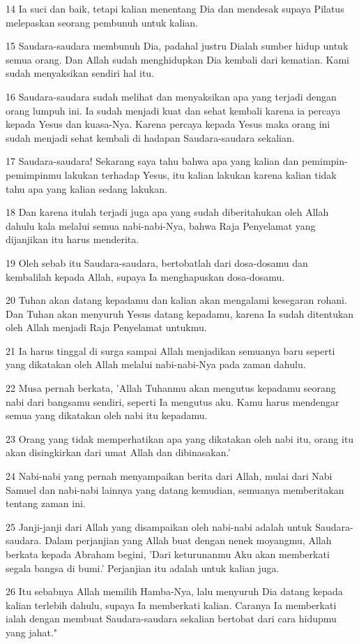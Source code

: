 \par 14 Ia suci dan baik, tetapi kalian menentang Dia dan mendesak supaya Pilatus melepaskan seorang pembunuh untuk kalian.
\par 15 Saudara-saudara membunuh Dia, padahal justru Dialah sumber hidup untuk semua orang. Dan Allah sudah menghidupkan Dia kembali dari kematian. Kami sudah menyaksikan sendiri hal itu.
\par 16 Saudara-saudara sudah melihat dan menyaksikan apa yang terjadi dengan orang lumpuh ini. Ia sudah menjadi kuat dan sehat kembali karena ia percaya kepada Yesus dan kuasa-Nya. Karena percaya kepada Yesus maka orang ini sudah menjadi sehat kembali di hadapan Saudara-saudara sekalian.
\par 17 Saudara-saudara! Sekarang saya tahu bahwa apa yang kalian dan pemimpin-pemimpinmu lakukan terhadap Yesus, itu kalian lakukan karena kalian tidak tahu apa yang kalian sedang lakukan.
\par 18 Dan karena itulah terjadi juga apa yang sudah diberitahukan oleh Allah dahulu kala melalui semua nabi-nabi-Nya, bahwa Raja Penyelamat yang dijanjikan itu harus menderita.
\par 19 Oleh sebab itu Saudara-saudara, bertobatlah dari dosa-dosamu dan kembalilah kepada Allah, supaya Ia menghapuskan dosa-dosamu.
\par 20 Tuhan akan datang kepadamu dan kalian akan mengalami kesegaran rohani. Dan Tuhan akan menyuruh Yesus datang kepadamu, karena Ia sudah ditentukan oleh Allah menjadi Raja Penyelamat untukmu.
\par 21 Ia harus tinggal di surga sampai Allah menjadikan semuanya baru seperti yang dikatakan oleh Allah melalui nabi-nabi-Nya pada zaman dahulu.
\par 22 Musa pernah berkata, 'Allah Tuhanmu akan mengutus kepadamu seorang nabi dari bangsamu sendiri, seperti Ia mengutus aku. Kamu harus mendengar semua yang dikatakan oleh nabi itu kepadamu.
\par 23 Orang yang tidak memperhatikan apa yang dikatakan oleh nabi itu, orang itu akan disingkirkan dari umat Allah dan dibinasakan.'
\par 24 Nabi-nabi yang pernah menyampaikan berita dari Allah, mulai dari Nabi Samuel dan nabi-nabi lainnya yang datang kemudian, semuanya memberitakan tentang zaman ini.
\par 25 Janji-janji dari Allah yang disampaikan oleh nabi-nabi adalah untuk Saudara-saudara. Dalam perjanjian yang Allah buat dengan nenek moyangmu, Allah berkata kepada Abraham begini, 'Dari keturunanmu Aku akan memberkati segala bangsa di bumi.' Perjanjian itu adalah untuk kalian juga.
\par 26 Itu sebabnya Allah memilih Hamba-Nya, lalu menyuruh Dia datang kepada kalian terlebih dahulu, supaya Ia memberkati kalian. Caranya Ia memberkati ialah dengan membuat Saudara-saudara sekalian bertobat dari cara hidupmu yang jahat."


